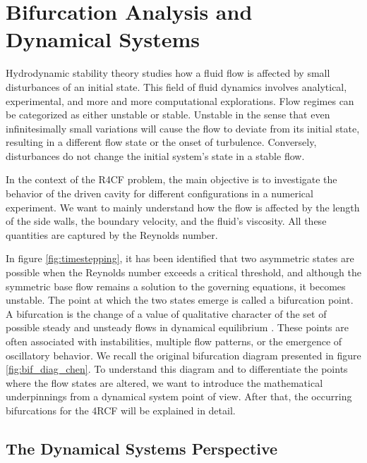 
\section{Bifurcation Analysis and Dynamical Systems} \label{sec:bif}

Hydrodynamic stability theory studies how a fluid flow is affected by small
disturbances of an initial state. This field of fluid dynamics involves
analytical, experimental, and more and more computational explorations. Flow
regimes can be categorized as either unstable or stable. Unstable in the sense
that even infinitesimally small variations will cause the flow to deviate from
its initial state, resulting in a different flow state or the onset of
turbulence. Conversely, disturbances do not change the initial system's state
in a stable flow.

In the context of the R4CF problem, the main objective is to investigate the
behavior of the driven cavity for different configurations in a numerical
experiment. We want to mainly understand how the flow is affected by the length
of the side walls, the boundary velocity, and the fluid's viscosity. All these
quantities are captured by the Reynolds number.

In figure \ref{fig:timestepping}, it has been identified that two asymmetric
states are possible when the Reynolds number exceeds a critical threshold, and
although the symmetric base flow remains a solution to the governing equations,
it becomes unstable. The point at which the two states emerge is called a
bifurcation point. A bifurcation is the change of a value of qualitative
character of the set of possible steady and unsteady flows in dynamical
equilibrium \citep{drazin2002}. These points are often associated with
instabilities, multiple flow patterns, or the emergence of oscillatory
behavior. We recall the original bifurcation diagram presented in figure
\ref{fig:bif_diag_chen}. To understand this diagram and to differentiate the
points where the flow states are altered, we want to introduce the mathematical
underpinnings from a dynamical system point of view. After that, the occurring
bifurcations for the 4RCF will be explained in detail.

\subsection{The Dynamical Systems Perspective}

